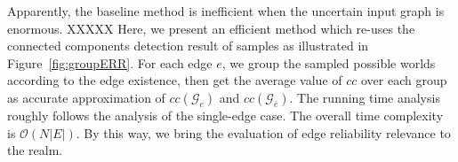 Apparently, the baseline method is inefficient when the uncertain input graph is enormous.
XXXXX
Here, we present an efficient method which re-uses 
the connected components detection result of samples as illustrated in Figure~\ref{fig:groupERR}. 
For each edge $e$, we group the sampled possible worlds according to the edge existence, 
then get the average value of $cc$ over each group as accurate approximation of $cc(\mathcal{G}_{e})$ and $cc(\mathcal{G}_{\bar{e}})$.
The running time analysis roughly follows the analysis of the single-edge case.  
The overall time complexity is $\mathcal{O}(N |E|)$. 
By this way, we bring the evaluation of edge reliability relevance to the realm.